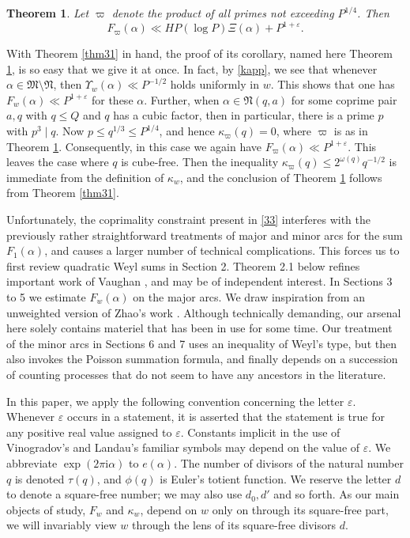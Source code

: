\documentclass[reqno]{amsart}
\newcommand\Ups{\Upsilon}
\newtheorem{thm}{Theorem}[section]
\numberwithin{equation}{section}
\begin{document}
\begin{thm}\label{thm32} Let $\varpi$ denote the product of all primes not exceeding $P^{1/4}$. Then 
$$ F_\varpi(\alpha) \ll HP(\log P) \Xi(\alpha) + P^{1+\varepsilon}. $$
\end{thm}

With Theorem \ref{thm31} in hand, the proof of its corollary, named here Theorem \ref{thm32}, is so easy that we give it at once. In fact, by \eqref{kapp}, we see that whenever $\alpha\in\mathfrak M\setminus \mathfrak N$, then $\Ups_w(\alpha) \ll P^{-1/2}$ holds
 uniformly in $w$. This shows that one has $F_w(\alpha)\ll P^{1+\varepsilon}$ for these $\alpha$. Further, when $\alpha\in \mathfrak N(q,a)$ for some coprime pair $a,q$ with $q\le Q$ and $q$ has a cubic factor, then in particular, there is a prime $p$ with $p^3\mid q$. Now $p\le q^{1/3}\le P^{1/4}$, and hence $\kappa_\varpi(q)=0$, where $\varpi$ is as in Theorem \ref{thm32}. Consequently, in this case we again have 
$F_\varpi(\alpha)\ll  P^{1+\varepsilon}$. This leaves the case where $q$ is cube-free. Then the inequality $\kappa_\varpi(q) \le 2^{\omega(q)}q^{-1/2} $ is immediate from the definition of $\kappa_w$, and the conclusion of Theorem \ref{thm32} follows from Theorem \ref{thm31}.







Unfortunately, the coprimality constraint present in \eqref{33} interferes with the previously rather straightforward treatments of major and minor arcs for the sum $F_1(\alpha)$, and causes a larger number of technical complications. This forces us to first review quadratic Weyl sums in Section 2. Theorem 2.1 below refines important work of Vaughan \cite{gen}, and may be of independent interest. In Sections 3 to 5 we estimate $F_w(\alpha)$ on the major arcs. We draw inspiration from an unweighted version \cite{B24} of Zhao's work \cite{Z}.  Although technically demanding, our arsenal here solely contains materiel that has been in use for some time. Our treatment of the minor arcs in Sections 6 and 7 uses an inequality of Weyl's type, but then also invokes the Poisson summation formula, and finally depends on a succession of counting processes that do not seem to have any ancestors in the literature.

In this paper, we apply the following convention concerning the letter $\varepsilon$. Whenever $\varepsilon$ occurs in a statement, it is asserted that the statement is true for any positive real value assigned to $\varepsilon$. Constants implicit in the use of Vinogradov's and Landau's familiar symbols may depend on the value of $\varepsilon$. We abbreviate $\exp(2\pi \mathrm i \alpha)$ to $e(\alpha)$. The number of divisors of the natural number $q$ is denoted $\tau(q)$,  and $\phi(q)$ is Euler's totient function. {We reserve the letter $d$ to denote a square-free number; we may also use $d_0,d'$ and so forth. As our main objects of study, $F_w$ and $\kappa_w$, depend on $w$ only on through its square-free part, we will invariably view $w$ through the lens of its square-free divisors $d$.}
\end{document}
